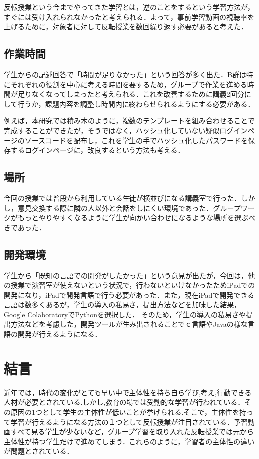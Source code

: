 \documentclass[a4j,11pt]{jsarticle}
\begin{document}
反転授業という今までやってきた学習とは，逆のことをするという学習方法が，すぐには受け入れられなかったと考えられる．よって，事前学習動画の視聴率を上げるために，対象者に対して反転授業を数回繰り返す必要があると考えた．
\subsection{作業時間}
学生からの記述回答で「時間が足りなかった」という回答が多く出た．B群は特にそれぞれの役割を中心に考える時間を要するため，グループで作業を進める時間が足りなくなってしまったと考えられる．これを改善するために講義2回分にして行うか，課題内容を調整し時間内に終わらせられるようにする必要がある．

例えば，本研究では積み木のように，複数のテンプレートを組み合わせることで完成することができたが，そうではなく，ハッシュ化していない疑似ログインページのソースコードを配布し，これを学生の手でハッシュ化したパスワードを保存するログインページに，改良するという方法も考える．

\subsection{場所}
今回の授業では普段から利用している生徒が横並びになる講義室で行った．しかし，意見交換する際に隣の人以外と会話をしにくい環境であった．グループワークがもっとやりやすくなるように学生が向かい合わせになるような場所を選ぶべきであった．

\subsection{開発環境}
学生から「既知の言語での開発がしたかった」という意見が出たが，今回は，他の授業で演習室が使えないという状況で，行わないといけなかったためiPadでの開発になり，iPadで開発言語で行う必要があった．また，現在iPadで開発できる言語は数多くあるが，学生の導入の私易さ，提出方法などを加味した結果，Google ColaboratoryでPythonを選択した．
そのため，学生の導入の私易さや提出方法などを考慮した，開発ツールが生み出されることでｃ言語やJavaの様な言語の開発が行えるようになる．



\newpage
\section{結言}
近年では，時代の変化がとても早い中で主体性を持ち自ら学び,考え,行動できる人材が必要とされている.しかし,教育の場では受動的な学習が行われている．その原因の1つとして学生の主体性が低いことが挙げられる.そこで，主体性を持って学習が行えるようになる方法の１つとして反転授業が注目されている．予習動画すべて見る学生が少ないなど，グループ学習を取り入れた反転授業では元から主体性が持つ学生だけで進めてしまう．これらのように，学習者の主体性の違いが問題とされている．
\end{document}
